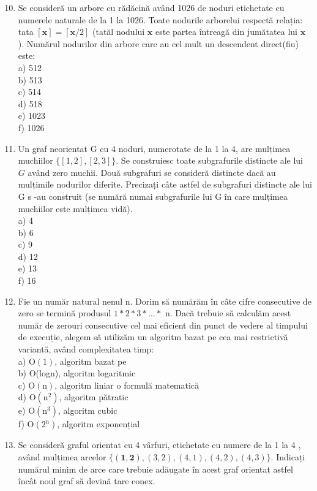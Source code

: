 \documentclass[10pt]{article}
\begin{document}
\begin{enumerate}
  \setcounter{enumi}{9}
  \item Se consideră un arbore cu rădăcină având 1026 de noduri etichetate cu numerele naturale de la 1 la 1026. Toate nodurile arborelui respectă relația: tata $[\mathbf{x}]=[\mathbf{x} / 2]$ (tatăl nodului $\mathbf{x}$ este partea întreagă din jumătatea lui $\mathbf{x}$ ). Numărul nodurilor din arbore care au cel mult un descendent direct(fiu) este:\\
a) 512\\
b) 513\\
c) 514\\
d) 518\\
e) 1023\\
f) 1026
  \item Un graf neorientat G cu 4 noduri, numerotate de la 1 la 4, are mulțimea muchiilor $\{[1,2],[2,3]\}$. Se construiesc toate subgrafurile distincte ale lui $G$ având zero muchii. Două subgrafuri se consideră distincte dacă au mulțimile nodurilor diferite. Precizați câte astfel de subgrafuri distincte ale lui G s -au construit (se numără numai subgrafurile lui G în care mulțimea muchiilor este mulțimea vidă).\\
a) 4\\
b) 6\\
c) 9\\
d) 12\\
e) 13\\
f) 16
  \item Fie un număr natural nenul n. Dorim să numărăm în câte cifre consecutive de zero se termină produsul $1 * 2 * 3 * \ldots *$ n. Dacă trebuie să calculăm acest număr de zerouri consecutive cel mai eficient din punct de vedere al timpului de execuție, alegem să utilizăm un algoritm bazat pe cea mai restrictivă variantă, având complexitatea timp:\\
a) $\mathrm{O}(1)$, algoritm bazat pe\\
b) O(logn), algoritm logaritmic\\
c) $\mathrm{O}(\mathrm{n})$, algoritm liniar o formulă matematică\\
d) $\mathrm{O}\left(\mathrm{n}^{2}\right)$, algoritm pătratic\\
e) $\mathrm{O}\left(\mathrm{n}^{3}\right)$, algoritm cubic\\
f) $\mathrm{O}\left(2^{\mathrm{n}}\right)$, algoritm exponențial
  \item Se consideră graful orientat cu 4 vârfuri, etichetate cu numere de la 1 la 4 , având mulțimea arcelor $\{(\mathbf{1}, \mathbf{2}),(3,2),(4,1),(4,2),(4,3)\}$. Indicați numărul minim de arce care trebuie adăugate în acest graf orientat astfel încât noul graf să devină tare conex.\\

\end{enumerate}
\end{document}
